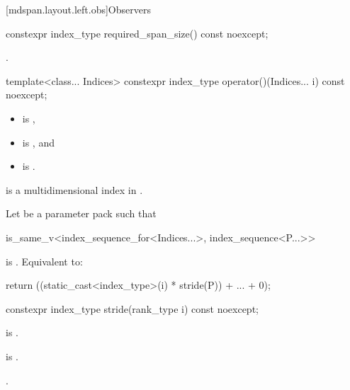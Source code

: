 [mdspan.layout.left.obs]{Observers}

%
\begin{itemdecl}
constexpr index_type required_span_size() const noexcept;
\end{itemdecl}

\begin{itemdescr}
\pnum
\returns
{}.
\end{itemdescr}

%
\begin{itemdecl}
template<class... Indices>
  constexpr index_type operator()(Indices... i) const noexcept;
\end{itemdecl}

\begin{itemdescr}
\pnum
\constraints
\begin{itemize}
\item
{} is ,
\item
{} is , and
\item
{} is .
\end{itemize}

\pnum
\expects
{} is
a multidimensional index in .

\pnum
\effects
Let  be a parameter pack such that
\begin{codeblock}
is_same_v<index_sequence_for<Indices...>, index_sequence<P...>>
\end{codeblock}
is .
Equivalent to:
\begin{codeblock}
return ((static_cast<index_type>(i) * stride(P)) + ... + 0);
\end{codeblock}
\end{itemdescr}

%
\begin{itemdecl}
constexpr index_type stride(rank_type i) const noexcept;
\end{itemdecl}

\begin{itemdescr}
\pnum
\constraints
{} is .

\pnum
\expects
{} is .

\pnum
\returns
{}.
\end{itemdescr}

